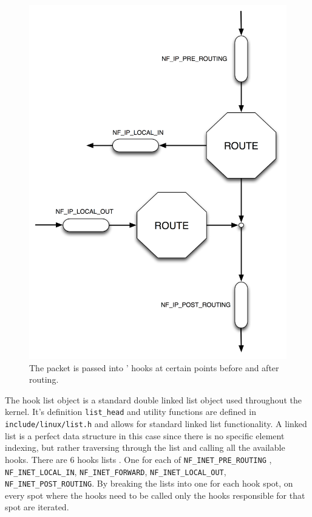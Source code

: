 \begin{figure}
\centering
\includegraphics[totalheight=0.40\textheight]{images/hooks.png}
\caption{The packet is passed into ' hooks at certain points
  before and after routing.}\label{fig:hooks}
\end{figure}

The hook list object is a standard double linked list object used throughout the kernel. It's definition \verb|list_head| and utility functions are defined in \verb|include/linux/list.h| and allows for standard linked list functionality. A linked list is a perfect data structure in this case since there is no specific element indexing, but rather traversing through the list and calling all the available hooks. There are 6 hooks lists . One for each of \verb|NF_INET_PRE_ROUTING| , \verb|NF_INET_LOCAL_IN|, \verb|NF_INET_FORWARD|, \verb|NF_INET_LOCAL_OUT|, \verb|NF_INET_POST_ROUTING|. By breaking the lists into one for each hook spot, on every spot where the hooks need to be called only the hooks responsible for that spot are iterated.

